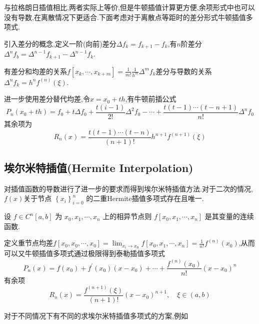 \documentclass[10pt]{yerbaformat}
\begin{document}
\par 与拉格朗日插值相比,两者实际上等价,但是牛顿插值计算更方便,余项形式中也可以没有导数,在离散情况下更适合.下面考虑对于离散点等距时的差分形式牛顿插值多项式.

\begin{definition}
    引入差分的概念,定义一阶(向前)差分$\Delta f_{k}=f_{k+1}-f_{k}$,有$n$阶差分$\Delta^{n} f_{b}=\Delta^{n-1} f_{k+1}-\Delta^{n-1} f_{k}$.
\end{definition}

\par 有差分和均差的关系$f\left[x_{k}, \cdots, x_{k+m}\right]=\frac{1}{m !} \frac{1}{h^{m}} \Delta^{m} f_{k}$差分与导数的关系$\Delta^{n} f_{k}=h^{n} f^{(n)}(\xi)$.

\par 进一步使用差分替代均差,令$x=x_{0}+t h$,有牛顿前插公式$$P_{n}\left(x_{0}+th\right)=f_{0}+t \Delta f_{0}+\frac{t(i-1)}{2 !} \Delta^{2} f_{0}-\cdots+\frac{t(t-1) \cdots(t-n+1)}{n !} \Delta^{n} f_{0}$$其余项为$$R_{n}(x)=\frac{t(t-1) \cdots(t-n)}{(n+1) !} h^{n+1} f^{(n+1)}(\xi)$$

\subsection{埃尔米特插值(Hermite Interpolation)}
\par 对插值函数的导数进行了进一步的要求而得到埃尔米特插值方法.对于二次的情况, $f(x)$关于节点 $\left\{x_{i}\right\}_{i=0}^{n}$ 的二重Hermite插值多项式存在且唯一.

\begin{theorem}
    设 $f \in C^{n}[a, b]$ 为 $x_{0}, x_{1}, \cdots, x_{n}$ 上的相异节点则 $f\left[x_{0}, x_{1}, \cdots, x_{n}\right]$ 是其变量的连续函数.
\end{theorem}

\par 定义重节点均差$f\left[x_{0}, x_{0}, \cdots, x_{0}\right]=\lim _{x_{i} \rightarrow x_{0}} f\left[x_{0}, x_{1}, \cdots, x_{n}\right]=\frac{1}{n !} f^{(n)}\left(x_{0}\right)$,从而可以又牛顿插值多项式通过极限得到泰勒插值多项式$$P_{n}(x)=f\left(x_{0}\right)+f^{\prime}\left(x_{0}\right)\left(x-x_{0}\right)+\cdots+\frac{f^{(n)}\left(x_{0}\right)}{n !}\left(x-x_{0}\right)^{n}$$有余项$$R_{n}(x)=\frac{f^{(n+1)}(\xi)}{(n+1) !}\left(x-x_{0}\right)^{n+1}, \quad \xi \in(a, b)$$

\par 对于不同情况下有不同的求埃尔米特插值多项式的方案,例如
\end{document}
